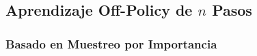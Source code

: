 \documentclass[10pt, envcountsect, handout, aspectratio=1610, hyperref={hypertexnames=true}]{beamer}
\begin{document}

\subsection{Aprendizaje Off-Policy de $n$ Pasos}




\subsubsection{Basado en Muestreo por Importancia}
\end{document}
